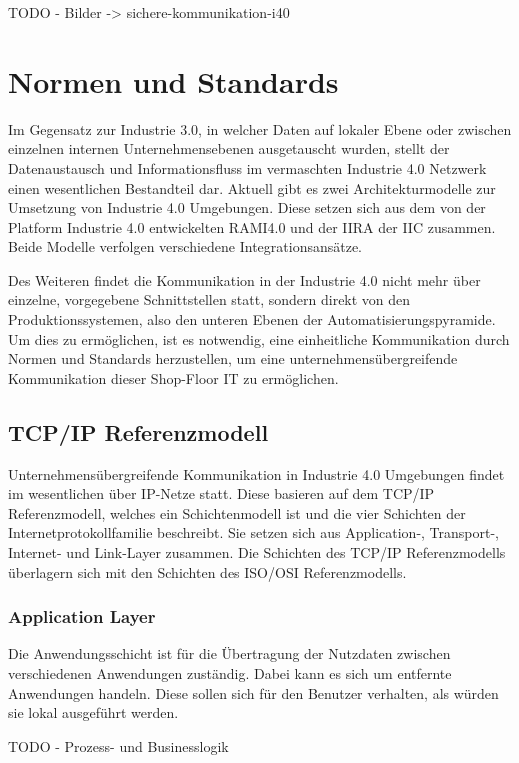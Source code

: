 TODO - Bilder -> sichere-kommunikation-i40

\section{Normen und Standards}
\label{Grundlagen:Normen und Standards}
Im Gegensatz zur Industrie 3.0, in welcher Daten auf lokaler Ebene oder zwischen einzelnen internen Unternehmensebenen ausgetauscht wurden, stellt der Datenaustausch und Informationsfluss im vermaschten Industrie 4.0 Netzwerk einen wesentlichen Bestandteil dar. Aktuell gibt es zwei Architekturmodelle zur Umsetzung von Industrie 4.0 Umgebungen. Diese setzen sich aus dem von der Platform Industrie 4.0 entwickelten \ac{RAMI4.0} und der \ac{IIRA} der \ac{IIC} zusammen. Beide Modelle verfolgen verschiedene Integrationsansätze.

Des Weiteren findet die Kommunikation in der Industrie 4.0 nicht mehr über einzelne, vorgegebene Schnittstellen statt, sondern direkt von den Produktionssystemen, also den unteren Ebenen der Automatisierungspyramide. Um dies zu ermöglichen, ist es notwendig, eine einheitliche Kommunikation durch Normen und Standards herzustellen, um eine unternehmensübergreifende Kommunikation dieser Shop-Floor IT zu ermöglichen. 

\subsection{TCP/IP Referenzmodell}
\label{Grundlagen:TCP/IP Referenzmodell}
Unternehmensübergreifende Kommunikation in Industrie 4.0 Umgebungen findet im wesentlichen über IP-Netze statt. Diese basieren auf dem TCP/IP Referenzmodell, welches ein Schichtenmodell ist und die vier Schichten der Internetprotokollfamilie beschreibt. Sie setzen sich aus Application-, Transport-, Internet- und Link-Layer zusammen. Die Schichten des TCP/IP Referenzmodells überlagern sich mit den Schichten des ISO/OSI Referenzmodells. 

\subsubsection{Application Layer}
Die Anwendungsschicht ist für die Übertragung der Nutzdaten zwischen verschiedenen Anwendungen zuständig. Dabei kann es sich um entfernte Anwendungen handeln. Diese sollen sich für den Benutzer verhalten, als würden sie lokal ausgeführt werden.

TODO - Prozess- und Businesslogik

